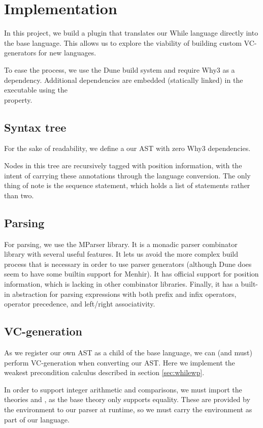 \section{Implementation} %

In this project,
we build a plugin that translates our While language directly into the base language.
This allows us to explore the viability of building custom VC-generators for new languages.

To ease the process, we use the Dune build system\cite{dunesite} and require Why3 as a dependency.
Additional dependencies are embedded (statically linked) in the executable
using the\\ %
 property.

\subsection{Syntax tree}

For the sake of readability,
we define a our AST with zero Why3 dependencies.

Nodes in this tree are recursively tagged with position information,
with the intent of carrying these annotations through the language conversion.
The only thing of note is the sequence statement,
which holds a list of statements rather than two.

\subsection{Parsing}

For parsing, we use the MParser library\cite{mparser}.
It is a monadic parser combinator library with several useful features.
It lets us avoid the more complex build process
that is necessary in order to use parser generators
(although Dune does seem to have some builtin support for Menhir).
It has official support for position information,
which is lacking in other combinator libraries.
Finally, it has a built-in abstraction for parsing expressions with both prefix and infix operators,
operator precedence, and left/right associativity.

\subsection{VC-generation}

As we register our own AST as a child of the base language,
we can (and must) perform VC-generation when converting our AST.
Here we implement the weakest precondition calculus described in section \ref{sec:whilewp}.

In order to support integer arithmetic and comparisons,
we must import the theories  and ,
as the base theory only supports equality.
These are provided by the environment to our parser at runtime,
so we must carry the environment as part of our language.
